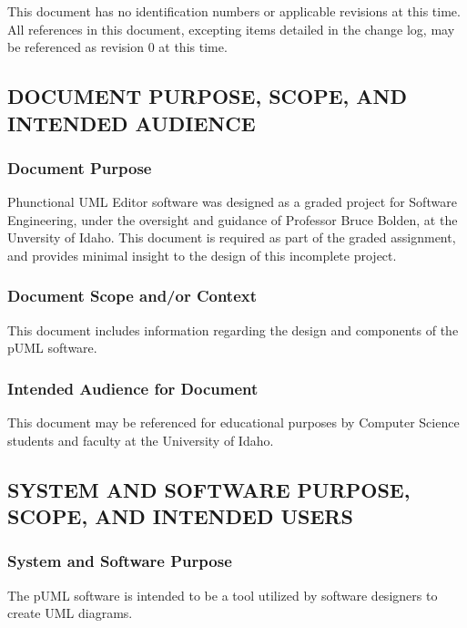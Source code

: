 \documentclass[twoside,letterpaper]{article}
\begin{document}
{\color{black}
This document has no identification numbers or applicable
revisions at this time.  All references in this document,
excepting items detailed in the change log, may be referenced
as revision 0 at this time.

\subsection[DOCUMENT PURPOSE, SCOPE, AND INTENDED
AUDIENCE]{\bfseries\color{black} DOCUMENT
PURPOSE, SCOPE, AND INTENDED AUDIENCE}

\subsubsection{Document Purpose}
{\color{black}
Phunctional UML Editor software was designed as a graded project for
Software Engineering, under the oversight and guidance of Professor
Bruce Bolden, at the Unversity of Idaho.  This document is required
as part of the graded assignment, and provides minimal insight to the
design of this incomplete project.  
}

\subsubsection{Document Scope and/or Context}
{\color{black}
This document includes information regarding the design and components of the pUML software.
}

\subsubsection{Intended Audience for Document}
{\color{black}
This document may be referenced for educational purposes by
Computer Science students and faculty at the University of Idaho.

}

\subsection[SYSTEM AND SOFTWARE PURPOSE, SCOPE, AND INTENDED
USERS]{\bfseries\color{black} SYSTEM AND
SOFTWARE PURPOSE, SCOPE, AND INTENDED USERS}


\subsubsection{System and Software Purpose}
{\color{black}
The pUML software is intended to be a tool utilized by software designers to create UML diagrams.
}

}
\end{document}
